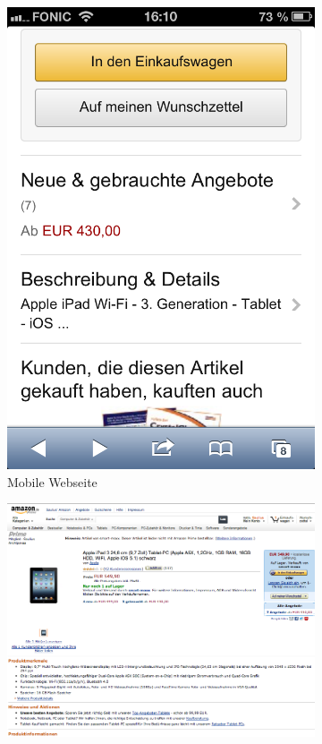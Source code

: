 \begin{figure}
	\centering
	\begin{subfigure}[b]{0.3\textwidth}
		\centering
		\includegraphics[width=1\textwidth]{img/amazon.png}
		\caption{Mobile Webseite}\label{fig:amazon}
	\end{subfigure}
	\begin{subfigure}[b]{0.6\textwidth}
		\centering
		\includegraphics[width=1\textwidth]{img/amazonFull.png}

\end{subfigure}
\end{figure}
